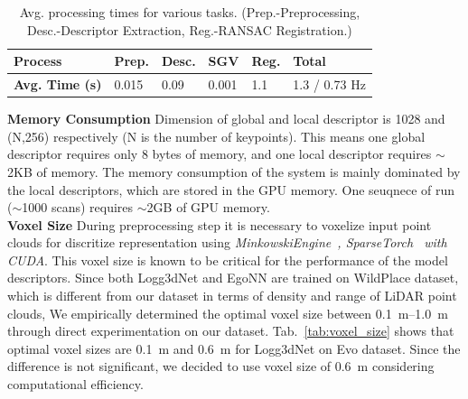 \begin{table}[h]
  \centering
  \small
  \begin{tabular}{@{}llllll@{}}
  \toprule
  \textbf{Process} & \textbf{Prep.} & \textbf{Desc.} & \textbf{SGV} & \textbf{Reg.} & \textbf{Total} \\ \midrule
  \textbf{Avg. Time (s)} & 0.015 & 0.09 & 0.001 & 1.1 & 1.3 / 0.73 Hz \\
  \bottomrule
  \end{tabular}
  \caption{Avg. processing times for various tasks. (Prep.-Preprocessing, Desc.-Descriptor Extraction, Reg.-RANSAC Registration.)}
  \label{tab:my-table}
\end{table}
\newline
\textbf{Memory Consumption}\hspace{0.5em} Dimension of global and local descriptor is 1028 and (N,256) respectively (N is the number of keypoints). This means one global descriptor requires only 8 bytes of memory, and one local descriptor requires $\sim$2KB of memory. The memory consumption of the system is mainly dominated by the local descriptors, which are stored in the GPU memory. One seuqnece of run ($\sim$1000 scans) requires $\sim$2GB of GPU memory.\\
\newline
\textbf{Voxel Size}\hspace{0.5em} During preprocessing step it is necessary to voxelize input point clouds for discritize representation using \emph{MinkowskiEngine~\cite{choy20194cvpr}, SparseTorch~\cite{tang2023MICRO} with CUDA}. This voxel size is known to be critical for the performance of the model descriptors. Since both Logg3dNet and EgoNN are trained on WildPlace dataset, which is different from our dataset in terms of density and range of LiDAR point clouds, We empirically determined the optimal voxel size between \SIrange{0.1}{1.0}{\meter} through direct experimentation on our dataset. Tab.~\ref{tab:voxel_size} shows that optimal voxel sizes are \SI{0.1}{\meter} and \SI{0.6}{\meter} for Logg3dNet on Evo dataset. Since the difference is not significant, we decided to use voxel size of \SI{0.6}{\meter} considering computational efficiency.\\

